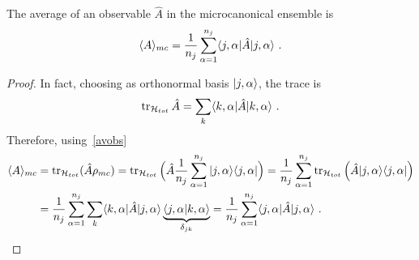     The average of an observable $\hat A$ in the microcanonical ensemble is 
    \begin{equation*}
        \langle A\rangle_{mc} = \frac{1}{n_j} \sum_{\alpha=1}^{n_j} \langle j,\alpha\vert \hat A \vert j,\alpha\rangle ~.
    \end{equation*}
    \begin{proof}
        In fact, choosing as orthonormal basis $\vert j, \alpha\rangle$, the trace is 
        \begin{equation*}
            \operatorname{tr}_{\mathcal H_{tot}} \hat A = \sum_k \langle k, \alpha\vert \hat A \vert k, \alpha\rangle ~.
        \end{equation*}
        Therefore, using~\eqref{avobs}
        \begin{equation*}
        \begin{aligned}
            \langle A\rangle_{mc} & = \operatorname{tr}_{\mathcal H_{tot}} (\hat A \rho_{mc}) = \operatorname{tr}_{\mathcal H_{tot}} \Big ( \hat A \frac{1}{n_j} \sum_{\alpha=1}^{n_j} \vert j, \alpha\rangle \langle j, \alpha\vert \Big) = \frac{1}{n_j} \sum_{\alpha=1}^{n_j} \operatorname{tr}_{\mathcal H_{tot}} \Big ( \hat A \vert j, \alpha\rangle \langle j, \alpha\vert \Big) \\ & = \frac{1}{n_j} \sum_{\alpha=1}^{n_j} \sum_k \langle k, \alpha\vert \hat A \vert j, \alpha\rangle \underbrace{\langle j, \alpha\vert k, \alpha\rangle}_{\delta_{jk}} = \frac{1}{n_j} \sum_{\alpha=1}^{n_j} \langle j, \alpha\vert \hat A \vert j, \alpha\rangle ~.
        \end{aligned}
        \end{equation*}
    \end{proof}

